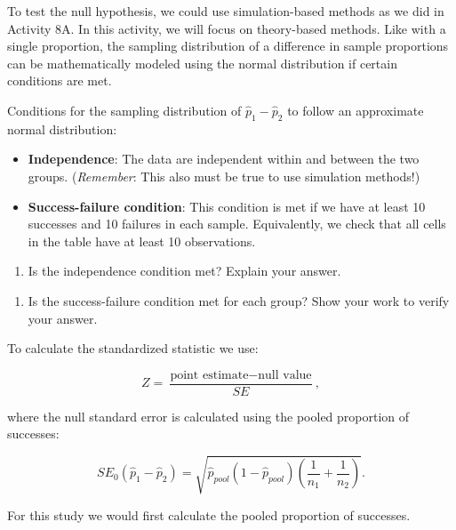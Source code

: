 \documentclass[
]{report}
\providecommand{\tightlist}{%
  \setlength{\itemsep}{0pt}\setlength{\parskip}{0pt}}
\begin{document}
To test the null hypothesis, we could use simulation-based methods as we did in Activity 8A. In this activity, we will focus on theory-based methods. Like with a single proportion, the sampling distribution of a difference in sample proportions can be mathematically modeled using the normal distribution if certain conditions are met.

Conditions for the sampling distribution of \(\hat{p}_1-\hat{p}_2\) to follow an approximate normal distribution:

\begin{itemize}
\item
  \textbf{Independence}: The data are independent within and between the two groups. (\emph{Remember}: This also must be true to use simulation methods!)
\item
  \textbf{Success-failure condition}: This condition is met if we have at least 10 successes and 10 failures in each sample. Equivalently, we check that all cells in the table have at least 10 observations.
\end{itemize}

\begin{enumerate}
\def\labelenumi{\arabic{enumi}.}
\setcounter{enumi}{4}
\tightlist
\item
  Is the independence condition met? Explain your answer.
\end{enumerate}

\vspace{0.4in}

\begin{enumerate}
\def\labelenumi{\arabic{enumi}.}
\setcounter{enumi}{5}
\tightlist
\item
  Is the success-failure condition met for each group? Show your work to verify your answer.
\end{enumerate}

\vspace{0.8in}
\newpage

To calculate the standardized statistic we use:

\[
Z = \frac{\text{point estimate} - \text{null value}}{SE},
\]

where the null standard error is calculated using the pooled proportion of successes:

\[
SE_0(\hat{p}_1-\hat{p}_2)=\sqrt{\hat{p}_{pool}(1-\hat{p}_{pool})\left(\frac{1}{n_1}+\frac{1}{n_2}\right)}.
\]

For this study we would first calculate the pooled proportion of successes.
\end{document}
